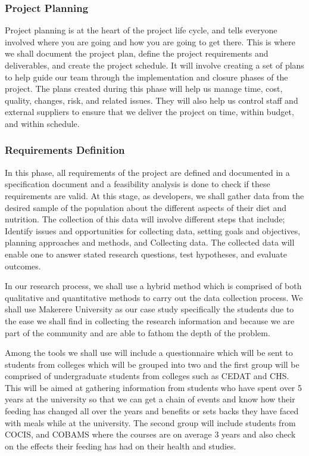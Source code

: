 \documentclass{article}
\begin{document}
\subsubsection{Project Planning}
Project planning is at the heart of the project life cycle, and tells everyone involved where you are going and how you are going to get there. This is where we shall document the project plan, define the project requirements and deliverables, and create the project schedule. It will involve creating a set of plans to help guide our team through the implementation and closure phases of the project. The plans created during this phase will help us manage time, cost, quality, changes, risk, and related issues. They will also help us control staff and external suppliers to ensure that we deliver the project on time, within budget, and within schedule.

\subsubsection{Requirements Definition}
In this phase, all requirements of the project are defined and documented in a specification document and a feasibility analysis is done to check if these requirements are valid. At this stage, as developers, we shall gather data from the desired sample of the population about the different aspects of their diet and nutrition. The collection of this data will involve different steps that include; Identify issues and opportunities for collecting data, setting goals and objectives, planning approaches and methods, and Collecting data. The collected data will enable one to answer stated research questions, test hypotheses, and evaluate outcomes.

In our research process, we shall use a hybrid method which is comprised of both qualitative and quantitative methods to carry out the data collection process. We shall use Makerere University as our case study specifically the students due to the ease we shall find in collecting the research information and because we are part of the community and are able to fathom the depth of the problem.   

Among the tools we shall use will include a questionnaire which will be sent to students from colleges which will be grouped into two and the first group will be comprised of undergraduate students from colleges such as CEDAT and CHS. This will be aimed at gathering information from students who have spent over 5 years at the university so that we can get a chain of events and know how their feeding has changed all over the years and benefits or sets backs they have faced with meals while at the university. The second group will include students from COCIS,  and COBAMS where the courses are on average 3 years and also check on the effects their feeding has had on their health and studies. 
\end{document}
